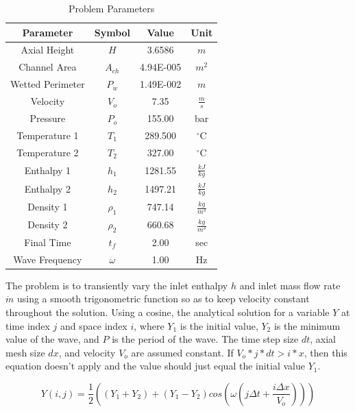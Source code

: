 \documentclass{mc2015}
\begin{document}
\begin{table}[h]
\center
\caption{Problem Parameters}
\label{table:prameters}
\begin{tabular}{|c|c|c|c|}
\hline
Parameter	&	Symbol	&	Value	&	Unit	\\ \hline
Axial Height	&	$H$	&	3.6586	&	$m$	\\ \hline
Channel Area	&	$A_{ch}$	&	4.94E-005	&	$m^{2}$	\\ \hline
Wetted Perimeter	&	$P_{w}$	&	1.49E-002	&	$m$	\\ \hline
Velocity	&	$V_{o}$	&	7.35	&	$\frac{m}{s}$	\\ \hline
Pressure	&	$P_{o}$	&	155.00	&	bar	\\ \hline
Temperature 1	&	$T_{1}$	&	289.500	&	$^{\circ}$C	\\ \hline
Temperature 2	&	$T_{2}$	&	327.00	&	$^{\circ}$C	\\ \hline
Enthalpy 1	&	$h_{1}$	&	1281.55	&	$\frac{kJ}{kg}$	\\ \hline
Enthalpy 2	&	$h_{2}$	&	1497.21	&	$\frac{kJ}{kg}$	\\ \hline
Density 1	&	$\rho_{1}$	&	747.14	&	$\frac{kg}{m^{3}}$	\\ \hline
Density 2	&	$\rho_{2}$	&	660.68	&	$\frac{kg}{m^{3}}$	\\ \hline
Final Time	&	$t_{f}$	&	2.00	&	sec	\\ \hline
Wave Frequency	&	$\omega$	&	1.00	&	Hz	\\ \hline
\end{tabular}
\end{table}

The problem is to transiently vary the inlet enthalpy $h$ and inlet mass flow
rate $\dot{m}$ using a smooth trigonometric function so as to keep velocity
constant throughout the solution. Using a cosine, the analytical solution for a
variable $Y$ at time index $j$ and space index $i$, where $Y_{1}$ is the initial
value, $Y_{2}$ is the minimum value of the wave, and $P$ is the period of the
wave. The time step size $dt$, axial mesh size $dx$, and velocity $V_{o}$ are
assumed constant. If $V_{o}*j*dt>i*x$, then this equation doesn't apply and the
value should just equal the initial value $Y_{1}$.

\begin{equation}
	Y(i,j) = \frac{1}{2} \left( 
			(Y_{1}+Y_{2}) + (Y_{1}-Y_{2}) cos\left(
				\omega \left( j \Delta t + \frac{i \Delta x}{V_{o}} \right)
				\right)
			\right)
\end{equation}
\end{document}
